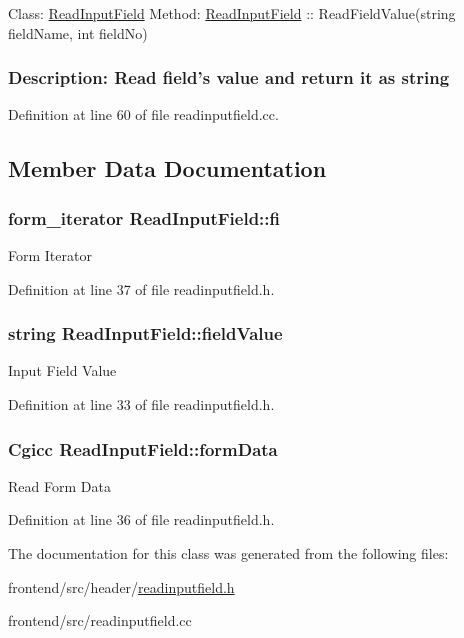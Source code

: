  Class\-: \hyperlink{classReadInputField}{Read\-Input\-Field} Method\-: \hyperlink{classReadInputField}{Read\-Input\-Field} \-:\-: Read\-Field\-Value(string field\-Name, int field\-No) \subsubsection*{Description\-: Read field's value and return it as string }

Definition at line 60 of file readinputfield.\-cc.



\subsection{Member Data Documentation}
\hypertarget{classReadInputField_ae252dc321be04c2c1afa6928ad16a45d}{
\subsubsection[{fi}]{\setlength{\rightskip}{0pt plus 5cm}form\-\_\-iterator Read\-Input\-Field\-::fi\hspace{0.3cm}{\ttfamily [protected]}}}\label{classReadInputField_ae252dc321be04c2c1afa6928ad16a45d}
Form Iterator 

Definition at line 37 of file readinputfield.\-h.

\hypertarget{classReadInputField_a0d95496b5fc8fb4badd4af19492182ae}{
\subsubsection[{field\-Value}]{\setlength{\rightskip}{0pt plus 5cm}string Read\-Input\-Field\-::field\-Value\hspace{0.3cm}{\ttfamily [protected]}}}\label{classReadInputField_a0d95496b5fc8fb4badd4af19492182ae}
Input Field Value 

Definition at line 33 of file readinputfield.\-h.

\hypertarget{classReadInputField_a1e4ebac8979fd9b2771320d669fce5fc}{
\subsubsection[{form\-Data}]{\setlength{\rightskip}{0pt plus 5cm}Cgicc Read\-Input\-Field\-::form\-Data\hspace{0.3cm}{\ttfamily [protected]}}}\label{classReadInputField_a1e4ebac8979fd9b2771320d669fce5fc}
Read Form Data 

Definition at line 36 of file readinputfield.\-h.



The documentation for this class was generated from the following files\-:\begin{DoxyCompactItemize}
\item 
frontend/src/header/\hyperlink{readinputfield_8h}{readinputfield.\-h}\item 
frontend/src/readinputfield.\-cc\end{DoxyCompactItemize}
